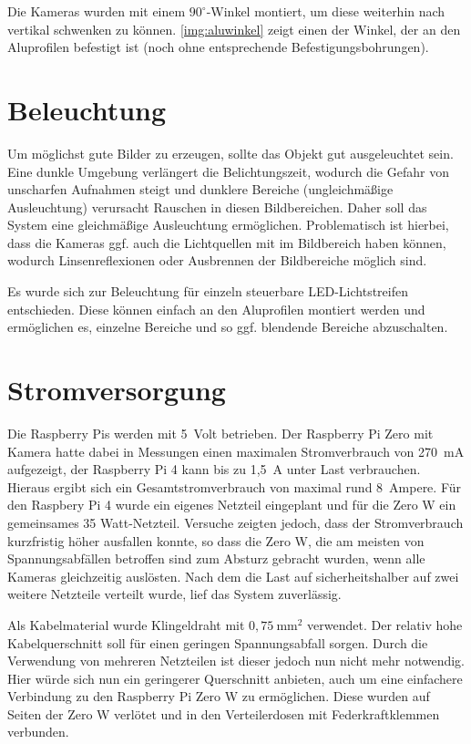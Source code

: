 \documentclass[./00PhotoBox.tex]{subfiles}
\begin{document}
Die Kameras wurden mit einem $90^\circ$-Winkel montiert, um diese weiterhin nach vertikal schwenken zu können. \autoref{img:aluwinkel} zeigt einen der Winkel, der an den Aluprofilen befestigt ist (noch ohne entsprechende Befestigungsbohrungen).


\section{Beleuchtung}
Um möglichst gute Bilder zu erzeugen, sollte das Objekt gut ausgeleuchtet sein. Eine dunkle Umgebung verlängert die Belichtungszeit, wodurch die Gefahr von unscharfen Aufnahmen steigt und dunklere Bereiche (ungleichmäßige Ausleuchtung) verursacht Rauschen in diesen Bildbereichen. Daher soll das System eine gleichmäßige Ausleuchtung ermöglichen. Problematisch ist hierbei, dass die Kameras ggf. auch die Lichtquellen mit im Bildbereich haben können, wodurch Linsenreflexionen oder Ausbrennen der Bildbereiche möglich sind.

Es wurde sich zur Beleuchtung für einzeln steuerbare LED-Lichtstreifen entschieden. Diese können einfach an den Aluprofilen montiert werden und ermöglichen es, einzelne Bereiche und so ggf. blendende Bereiche abzuschalten.

\section{Stromversorgung}
Die Raspberry Pis werden mit 5~Volt betrieben. Der Raspberry Pi Zero mit Kamera hatte dabei in Messungen einen maximalen Stromverbrauch von 270~mA aufgezeigt, der Raspberry Pi 4 kann bis zu 1,5~A unter Last verbrauchen. Hieraus ergibt sich ein Gesamtstromverbrauch von maximal rund 8~Ampere. Für den Raspbery Pi 4 wurde ein eigenes Netzteil eingeplant und für die Zero W ein gemeinsames 35 Watt-Netzteil. Versuche zeigten jedoch, dass der Stromverbrauch kurzfristig höher ausfallen konnte, so dass die Zero W, die am meisten von Spannungsabfällen betroffen sind zum Absturz gebracht wurden, wenn alle Kameras gleichzeitig auslösten. Nach dem die Last auf sicherheitshalber auf zwei weitere Netzteile verteilt wurde, lief das System zuverlässig.

Als Kabelmaterial wurde Klingeldraht mit $0,75~\text{mm}^2$ verwendet. Der relativ hohe Kabelquerschnitt soll für einen geringen Spannungsabfall sorgen. Durch die Verwendung von mehreren Netzteilen ist dieser jedoch nun nicht mehr notwendig. Hier würde sich nun ein geringerer Querschnitt anbieten, auch um eine einfachere Verbindung zu den Raspberry Pi Zero W zu ermöglichen. Diese wurden auf Seiten der Zero W verlötet und in den Verteilerdosen mit Federkraftklemmen verbunden.
\end{document}
